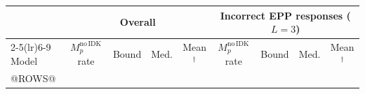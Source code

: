 \begin{tabular}{lcccccccc}
\toprule
 & \multicolumn{4}{c}{Overall} & \multicolumn{4}{c}{Incorrect EPP responses ($L=3$)}\\
\cmidrule(lr){2-5}\cmidrule(lr){6-9}
Model & $M_p^{\mathrm{no\,IDK}}$ rate & Bound & Med. & Mean$^\dagger$ &
$M_p^{\mathrm{no\,IDK}}$ rate & Bound & Med. & Mean$^\dagger$\\
\midrule
@ROWS@
\bottomrule
\end{tabular}
